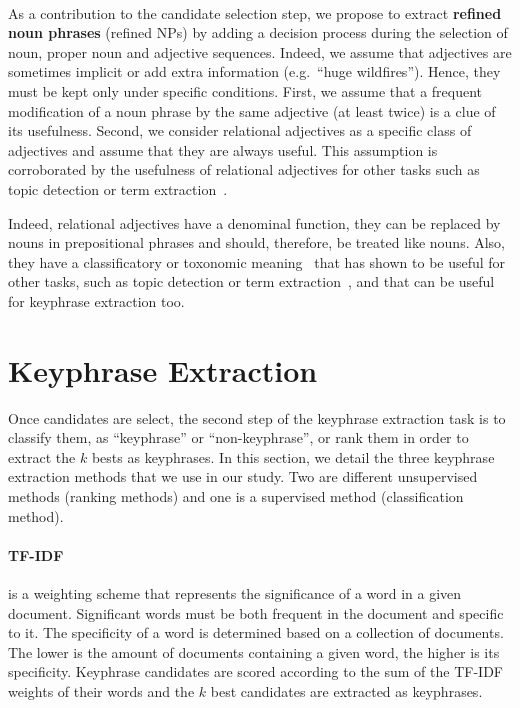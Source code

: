   \paragraph{}
  As a contribution to the candidate selection step, we propose to extract
  \textbf{refined noun phrases} (refined NPs) by adding a decision process
  during the selection of noun, proper noun and adjective sequences. Indeed,
  we assume that adjectives are sometimes implicit or add extra information
  (e.g.~``huge wildfires''). Hence, they must be kept only under specific
  conditions. First, we assume that a frequent modification of a noun phrase by
  the same adjective (at least twice) is a clue of its usefulness. Second, we
  consider relational adjectives as a specific class of adjectives and assume
  that they are always useful. This assumption is corroborated by the usefulness
  of relational adjectives for other tasks such as topic detection or term
  extraction~\cite{daille2001relationaladjectives}.
  
  Indeed, relational adjectives have a denominal
  function, they can be replaced by nouns in prepositional phrases and should,
  therefore, be treated like nouns. Also, they have a classificatory or
  toxonomic meaning~\cite{mcnally2004relationaladjectives} that has shown to be
  useful for other tasks, such as topic detection or term
  extraction~\cite{daille2001relationaladjectives}, and that can be useful for
  keyphrase extraction too.

\section{Keyphrase Extraction}
\label{sec:keyphrase_extraction}
  Once candidates are select, the second step of the keyphrase extraction task
  is to classify them, as ``keyphrase'' or ``non-keyphrase'', or rank them in
  order to extract the $k$ bests as keyphrases. In this section, we detail the
  three keyphrase extraction methods that we use in our study. Two are different
  unsupervised methods (ranking methods) and one is a supervised method
  (classification method).

  \paragraph{TF-IDF~\textnormal{\cite{jones1972tfidf}}} is a weighting scheme
  that represents the significance of a word in a given document. Significant
  words must be both frequent in the document and specific to it. The
  specificity of a word is determined based on a collection of documents. The
  lower is the amount of documents containing a given word, the higher is its
  specificity. Keyphrase candidates are scored according to the sum of the
  TF-IDF weights of their words and the $k$ best candidates are extracted as
  keyphrases.

